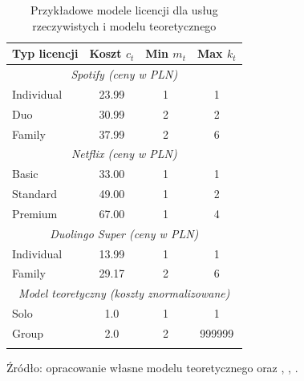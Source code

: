 \begin{table}[h!]
  \centering
  \caption{Przykładowe modele licencji dla usług rzeczywistych i modelu teoretycznego}
  \begin{tabular}{lccc}
    \hline
    \textbf{Typ licencji} & \textbf{Koszt $c_t$} & \textbf{Min $m_t$} & \textbf{Max $k_t$} \\
    \hline
    \multicolumn{4}{c}{\textit{Spotify (ceny w PLN)}}                                      \\
    Individual            & 23.99                & 1                  & 1                  \\
    Duo                   & 30.99                & 2                  & 2                  \\
    Family                & 37.99                & 2                  & 6                  \\
    \hline
    \multicolumn{4}{c}{\textit{Netflix (ceny w PLN)}}                                      \\
    Basic                 & 33.00                & 1                  & 1                  \\
    Standard              & 49.00                & 1                  & 2                  \\
    Premium               & 67.00                & 1                  & 4                  \\
    \hline
    \multicolumn{4}{c}{\textit{Duolingo Super (ceny w PLN)}}                               \\
    Individual            & 13.99                & 1                  & 1                  \\
    Family                & 29.17                & 2                  & 6                  \\
    \hline
    \multicolumn{4}{c}{\textit{Model teoretyczny (koszty znormalizowane)}}                 \\
    Solo                  & 1.0                  & 1                  & 1                  \\
    Group                 & 2.0                  & 2                  & 999999             \\
    \hline
    \label{tab:license_models_real}
  \end{tabular}

  Źródło: opracowanie własne modelu teoretycznego oraz \cite{spotify_price2024}, \cite{spotify_price2025}, \cite{duolingo_app2024}.

\end{table}


